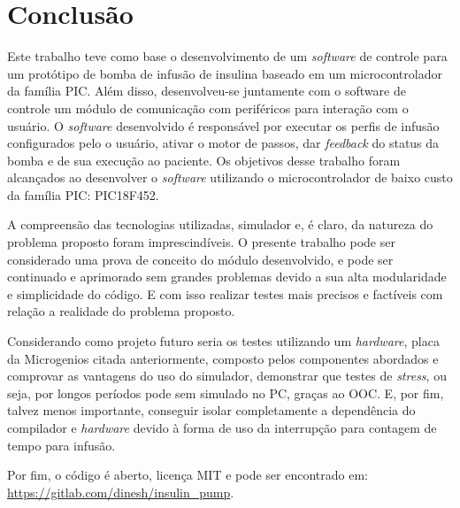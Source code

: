 \chapter{Conclusão}

Este trabalho teve como base o desenvolvimento de um \emph{software} de controle para um protótipo de bomba de infusão de insulina baseado em um microcontrolador da família PIC. Além disso, desenvolveu-se juntamente com o software de controle um módulo de comunicação com periféricos para interação com o usuário. O \emph{software} desenvolvido é responsável por executar os perfis de infusão configurados pelo o usuário, ativar o motor de passos, dar \emph{feedback} do status da bomba e de sua execução ao paciente. Os objetivos desse trabalho foram alcançados ao desenvolver o \emph{software} utilizando o microcontrolador de baixo custo da família PIC: PIC18F452. 

A compreensão das tecnologias utilizadas, simulador e, é claro, da natureza do problema proposto foram imprescindíveis. O presente trabalho pode ser considerado uma prova de conceito do módulo desenvolvido, e pode ser continuado e aprimorado sem grandes problemas devido a sua alta modularidade e simplicidade do código. E com isso realizar testes mais precisos e factíveis com relação a realidade do problema proposto. 

Considerando como projeto futuro seria os testes utilizando um \emph{hardware}, placa da Microgenios citada anteriormente, composto pelos componentes abordados e comprovar as vantagens do uso do simulador, demonstrar que testes de \emph{stress}, ou seja, por longos períodos pode sem simulado no PC, graças ao OOC. E, por fim, talvez menos importante, conseguir isolar completamente a dependência do compilador e \emph{hardware} devido à forma de uso da interrupção para contagem de tempo para infusão.

Por fim, o código é aberto, licença MIT e pode ser encontrado em:  \url{https://gitlab.com/dinesh/insulin_pump}.